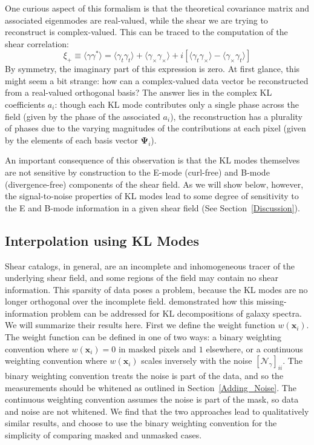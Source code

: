 \documentclass[twocolumn]{emulateapj}
\newcommand{\myvec}[1]{\boldsymbol{#1}}
\newcommand{\mymat}[1]{\boldsymbol{#1}}
\newcommand{\Noise}{\mymat{\mathcal{N}}}
\begin{document}
One curious aspect of this formalism is that the theoretical covariance
matrix and associated eigenmodes are real-valued, while the shear we are
trying to reconstruct is complex-valued.  This can be traced
to the computation of the shear correlation:
\begin{equation}
  \xi_+ \equiv \langle\gamma \gamma^*\rangle
  = \langle \gamma_t\gamma_t\rangle + \langle \gamma_\times\gamma_\times\rangle
  + i[\langle\gamma_t\gamma_\times\rangle - \langle\gamma_\times\gamma_t\rangle]
\end{equation}
By symmetry, the imaginary part of this expression
is zero. At first glance, this might seem a bit strange:
how can a complex-valued data vector be reconstructed from a
real-valued orthogonal basis?  The answer lies in the complex KL coefficients
$a_i$: though each KL mode contributes only a single phase across the field
(given by the phase of the associated $a_i$), the reconstruction has a 
plurality of phases due to the varying magnitudes of the contributions 
at each pixel (given by the elements of each basis vector $\myvec{\Psi}_i$).

An important consequence of this observation is that the KL modes 
themselves are not sensitive by construction to the E-mode (curl-free) 
and B-mode (divergence-free) components of the shear field. As we will
show below, however, the signal-to-noise properties of KL modes lead to 
some degree of sensitivity to the E and B-mode information in a given
shear field (See Section~\ref{Discussion}).


\subsection{Interpolation using KL Modes}
\label{KL_Interpolation}
Shear catalogs, in general, are an incomplete and inhomogeneous
tracer of the underlying shear field, and some regions of the field may 
contain no shear information.  This sparsity of data poses a problem,
because the KL modes are no longer orthogonal over the incomplete field.
\citet{Connolly99} demonstrated how this missing-information problem can be 
addressed for KL decompositions of galaxy
spectra. We will summarize their results here.  First we define the weight 
function $w(\myvec{x}_i)$.
The weight function can be defined in one of two ways: 
a binary weighting convention where
$w(\myvec{x}_i)=0$ in masked pixels and $1$ elsewhere, or a continuous 
weighting convention where $w(\myvec{x}_i)$ scales inversely with the noise 
$[\Noise_\gamma]_{ii}$.
The binary weighting convention treats the noise is part of the data, 
and so the measurements should be whitened as outlined in 
Section~\ref{Adding_Noise}.  
The continuous weighting convention assumes the noise is part of the mask, 
so data and noise are not whitened.
We find that the two approaches lead to qualitatively similar results, 
and choose to use the binary weighting convention for the simplicity of 
comparing masked and unmasked cases.
\end{document}
